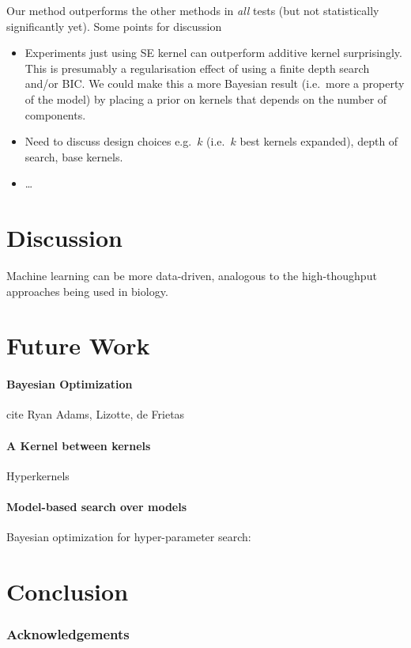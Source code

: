 \documentclass[twoside]{article}
\begin{document}



Our method outperforms the other methods in \emph{all} tests (but not statistically significantly yet).
Some points for discussion
\begin{itemize}
\item Experiments just using SE kernel can outperform additive kernel surprisingly. This is presumably a regularisation effect of using a finite depth search and/or BIC. We could make this a more Bayesian result (i.e.~more a property of the model) by placing a prior on kernels that depends on the number of components.
\item Need to discuss design choices e.g.~$k$ (i.e.~$k$ best kernels expanded), depth of search, base kernels.
\item \ldots
\end{itemize}

\section{Discussion}

Machine learning can be more data-driven, analogous to the high-thoughput approaches being used in biology. 

\section{Future Work}
\paragraph{Bayesian Optimization}

cite Ryan Adams, Lizotte, de Frietas

\paragraph{A Kernel between kernels}

Hyperkernels \cite{ong2002hyperkernels}

\paragraph{Model-based search over models}

Bayesian optimization for hyper-parameter search: \cite{snoek2012practical}

\section{Conclusion}

\subsubsection*{Acknowledgements}




\end{document}
